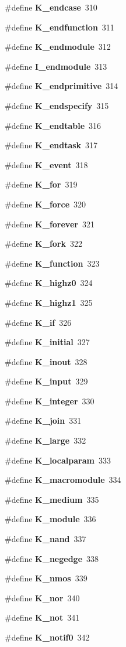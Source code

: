 \begin{CompactItemize}
\#define {\bf K\_\-endcase}\ 310
\item 
\#define {\bf K\_\-endfunction}\ 311
\item 
\#define {\bf K\_\-endmodule}\ 312
\item 
\#define {\bf I\_\-endmodule}\ 313
\item 
\#define {\bf K\_\-endprimitive}\ 314
\item 
\#define {\bf K\_\-endspecify}\ 315
\item 
\#define {\bf K\_\-endtable}\ 316
\item 
\#define {\bf K\_\-endtask}\ 317
\item 
\#define {\bf K\_\-event}\ 318
\item 
\#define {\bf K\_\-for}\ 319
\item 
\#define {\bf K\_\-force}\ 320
\item 
\#define {\bf K\_\-forever}\ 321
\item 
\#define {\bf K\_\-fork}\ 322
\item 
\#define {\bf K\_\-function}\ 323
\item 
\#define {\bf K\_\-highz0}\ 324
\item 
\#define {\bf K\_\-highz1}\ 325
\item 
\#define {\bf K\_\-if}\ 326
\item 
\#define {\bf K\_\-initial}\ 327
\item 
\#define {\bf K\_\-inout}\ 328
\item 
\#define {\bf K\_\-input}\ 329
\item 
\#define {\bf K\_\-integer}\ 330
\item 
\#define {\bf K\_\-join}\ 331
\item 
\#define {\bf K\_\-large}\ 332
\item 
\#define {\bf K\_\-localparam}\ 333
\item 
\#define {\bf K\_\-macromodule}\ 334
\item 
\#define {\bf K\_\-medium}\ 335
\item 
\#define {\bf K\_\-module}\ 336
\item 
\#define {\bf K\_\-nand}\ 337
\item 
\#define {\bf K\_\-negedge}\ 338
\item 
\#define {\bf K\_\-nmos}\ 339
\item 
\#define {\bf K\_\-nor}\ 340
\item 
\#define {\bf K\_\-not}\ 341
\item 
\#define {\bf K\_\-notif0}\ 342
\item 

\end{CompactItemize}
